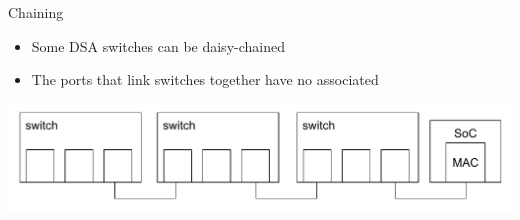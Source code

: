 \begin{frame}{Chaining}
	\begin{itemize}
		\item Some DSA switches can be daisy-chained
		\item The ports that link switches together have no associated 
	\end{itemize}
	\includegraphics[width=\textwidth]{slides/networking-driver-switch/chained.pdf}
\end{frame}

